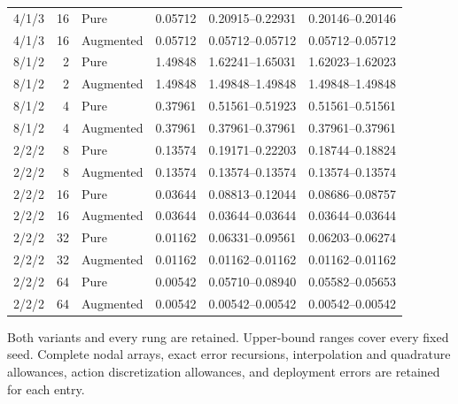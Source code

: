 {\begin{longtable}{rrlrcc}
4/1/3 & 16 & Pure & 0.05712 & 0.20915--0.22931 & 0.20146--0.20146 \\
4/1/3 & 16 & Augmented & 0.05712 & 0.05712--0.05712 & 0.05712--0.05712 \\
8/1/2 & 2 & Pure & 1.49848 & 1.62241--1.65031 & 1.62023--1.62023 \\
8/1/2 & 2 & Augmented & 1.49848 & 1.49848--1.49848 & 1.49848--1.49848 \\
8/1/2 & 4 & Pure & 0.37961 & 0.51561--0.51923 & 0.51561--0.51561 \\
8/1/2 & 4 & Augmented & 0.37961 & 0.37961--0.37961 & 0.37961--0.37961 \\
2/2/2 & 8 & Pure & 0.13574 & 0.19171--0.22203 & 0.18744--0.18824 \\
2/2/2 & 8 & Augmented & 0.13574 & 0.13574--0.13574 & 0.13574--0.13574 \\
2/2/2 & 16 & Pure & 0.03644 & 0.08813--0.12044 & 0.08686--0.08757 \\
2/2/2 & 16 & Augmented & 0.03644 & 0.03644--0.03644 & 0.03644--0.03644 \\
2/2/2 & 32 & Pure & 0.01162 & 0.06331--0.09561 & 0.06203--0.06274 \\
2/2/2 & 32 & Augmented & 0.01162 & 0.01162--0.01162 & 0.01162--0.01162 \\
2/2/2 & 64 & Pure & 0.00542 & 0.05710--0.08940 & 0.05582--0.05653 \\
2/2/2 & 64 & Augmented & 0.00542 & 0.00542--0.00542 & 0.00542--0.00542 \\
\hline
\end{longtable}}
{\footnotesize Both variants and every rung are retained. Upper-bound ranges cover every fixed seed. Complete nodal arrays, exact error recursions, interpolation and quadrature allowances, action discretization allowances, and deployment errors are retained for each entry.}
